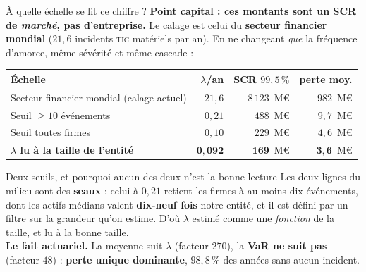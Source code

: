 \documentclass[11pt]{beamer}
\begin{document}
\begin{frame}{À quelle échelle se lit ce chiffre ?}
\small
\alert{\textbf{Point capital : ces montants sont un SCR de \emph{marché}, pas d'entreprise.}}
Le calage est celui du \textbf{secteur financier mondial} ($21{,}6$ incidents \textsc{tic}
matériels par an). En ne changeant \emph{que} la fréquence d'amorce, même sévérité et même
cascade :
\vspace{0.5mm}
\begin{center}\scriptsize
\begin{tabular}{@{}l r r r@{}}
\toprule
\textbf{Échelle} & \textbf{$\lambda$/an} & \textbf{SCR $99{,}5\,\%$} & \textbf{perte moy.} \\
\midrule
Secteur financier mondial (calage actuel) & $21{,}6$ & $8\,123$~M\euro & $982$~M\euro \\
Seuil \og{}$\geq 10$ événements\fg{} & $0{,}21$ & $488$~M\euro & $9{,}7$~M\euro \\
Seuil \og{}toutes firmes\fg{} & $0{,}10$ & $229$~M\euro & $4{,}6$~M\euro \\
\textbf{$\lambda$ lu à la taille de l'entité} & $\mathbf{0{,}092}$ & $\mathbf{169}$~M\euro &
$\mathbf{3{,}6}$~M\euro \\
\bottomrule
\end{tabular}
\end{center}
\vspace{1mm}
\begin{block}{Deux seuils, et pourquoi aucun des deux n'est la bonne lecture}
Les deux lignes du milieu sont des \textbf{seaux} : celui à $0{,}21$ retient les firmes à au
moins dix événements, dont les actifs médians valent \textbf{dix-neuf fois} notre entité, et
il est défini par un filtre sur la grandeur qu'on estime. D'où $\lambda$ estimé comme une
\emph{fonction} de la taille, et lu à la bonne taille.\\[2pt]
\textbf{Le fait actuariel.} La moyenne suit $\lambda$ (facteur $270$), la \textbf{VaR ne
suit pas} (facteur $48$) : \textbf{perte unique dominante}, $98{,}8\,\%$ des années sans
aucun incident.
\end{block}
\end{frame}
\end{document}
